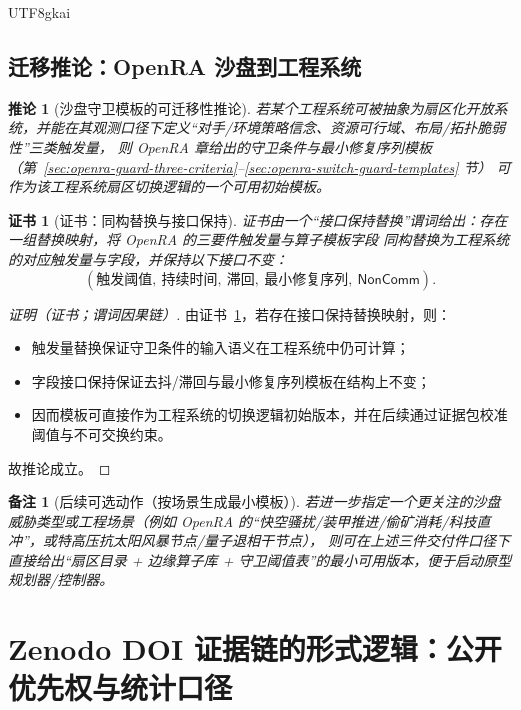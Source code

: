 \documentclass[12pt]{article}
\newtheorem{corollary}{推论}[section]
\newtheorem{remark}{备注}[section]
\newtheorem{Certificate}{证书}[section]
\begin{document}
\begin{CJK*}{UTF8}{gkai}
\subsection{迁移推论：OpenRA 沙盘到工程系统}
\label{sec:dialogue-transfer-corollary}

\begin{corollary}[沙盘守卫模板的可迁移性推论]
\label{cor:openra-guard-template-transfer}
若某个工程系统可被抽象为扇区化开放系统，并能在其观测口径下定义“对手/环境策略信念、资源可行域、布局/拓扑脆弱性”三类触发量，
则 OpenRA 章给出的守卫条件与最小修复序列模板（第~\ref{sec:openra-guard-three-criteria}--\ref{sec:openra-switch-guard-templates} 节）
可作为该工程系统扇区切换逻辑的一个可用初始模板。
\end{corollary}

\begin{Certificate}[证书：同构替换与接口保持]
\label{cert:openra-guard-template-transfer}
证书由一个“接口保持替换”谓词给出：存在一组替换映射，将 OpenRA 的三要件触发量与算子模板字段
同构替换为工程系统的对应触发量与字段，并保持以下接口不变：
\[
  (\text{触发阈值},\ \text{持续时间},\ \text{滞回},\ \text{最小修复序列},\ \mathsf{NonComm}).
\]
\end{Certificate}

\begin{proof}[证明（证书；谓词因果链）]
由证书~\ref{cert:openra-guard-template-transfer}，若存在接口保持替换映射，则：
\begin{itemize}
  \item 触发量替换保证守卫条件的输入语义在工程系统中仍可计算；
  \item 字段接口保持保证去抖/滞回与最小修复序列模板在结构上不变；
  \item 因而模板可直接作为工程系统的切换逻辑初始版本，并在后续通过证据包校准阈值与不可交换约束。
\end{itemize}
故推论成立。
\end{proof}

\begin{remark}[后续可选动作（按场景生成最小模板）]
若进一步指定一个更关注的沙盘威胁类型或工程场景（例如 OpenRA 的“快空骚扰/装甲推进/偷矿消耗/科技直冲”，或特高压抗太阳风暴节点/量子退相干节点），
则可在上述三件交付件口径下直接给出“扇区目录 + 边缘算子库 + 守卫阈值表”的最小可用版本，便于启动原型规划器/控制器。
\end{remark}

\section{Zenodo DOI 证据链的形式逻辑：公开优先权与统计口径}
\label{sec:zenodo-priority-formal-logic}


\end{CJK*}
\end{document}
